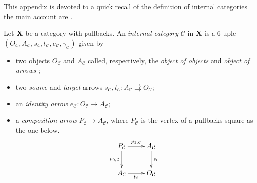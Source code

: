 \documentclass[a4paper,UKenglish,cleveref,pdftex,thm-restate,numberwithinsect]{lipics-v2021}
\def\X{\textbf {\textup{X}}}
\begin{document}
This appendix is devoted to a quick recall of the definition of internal categories the main account are \cite{borceux1994handbook1,maclane2012sheaves,mac2013categories,jacobs1999categorical}.


\begin{definition}\label{def:internal}
	Let $\X$ be a category with pullbacks. An \emph{internal category} $\mathcal{C}$ in $\X$ is a $6$-uple $(O_{\mathcal{C}}, A_{\mathcal{C}}, s_{\mathcal{C}}, t_{\mathcal{C}},e_{\mathcal{C}},  \gamma_{\mathcal{C}})$ given by
	\begin{itemize}
		\item two objects $O_{\mathcal{C}}$ and $A_{\mathcal{C}}$ called, respectively, the \emph{object of objects} and \emph{object of arrows} ;
		\item two \emph{source} and \emph{target} arrows $s_{\mathcal{C}}, t_{\mathcal{C}}\colon A_{\mathcal{C}}\rightrightarrows O_{\mathcal{C}}$;
		\item an \emph{identity arrow} $e_{\mathcal{C}}\colon O_{\mathcal{C}}\to A_{\mathcal{C}}$;
		\item a \emph{composition arrow} $P_{\mathcal{C}}\to A_{\mathcal{C}}$, where $P_{\mathcal{C}}$ is the vertex of a pullbacks square as the one below.
		\[\xymatrix{P_{\mathcal{C}} \ar[r]^{p_{1, \mathcal{C}}} \ar[d]_{p_{0, \mathcal{C}}} &A_{\mathcal{C}} \ar[d]^{s_{\mathcal{C}}} \\ A_{\mathcal{C}} \ar[r]_{t_{\mathcal{C}}}  &O_{\mathcal{C}} }\]
	\end{itemize}


\end{definition}
\end{document}
